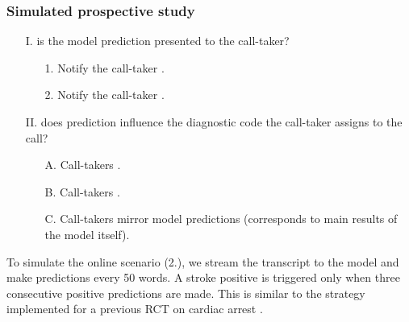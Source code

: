 \begin{frame}
    \frametitle{Simulated prospective study}
    \begin{enumerate}
        \item[I.]  is the model prediction presented to the call-taker?
        \begin{enumerate}
            \item[1.] Notify the call-taker .
            \item[2.] Notify the call-taker .
        \end{enumerate}
        \item[II.]  does prediction influence the diagnostic code the call-taker assigns to the call?
        \begin{enumerate}[label=\Alph*.]
            \item[A.] Call-takers .
            \item[B.] Call-takers .
            \item[C.] Call-takers mirror model predictions (corresponds to main results of the model itself).
        \end{enumerate}
    \end{enumerate}
    \vspace{1em}
    To simulate the online scenario (2.), we stream the transcript to the model and make predictions every 50 words. 
    A stroke positive is triggered only when three consecutive positive predictions are made. 
    This is similar to the strategy implemented for a previous RCT on cardiac arrest \cite{cite15}.

        
\end{frame}


